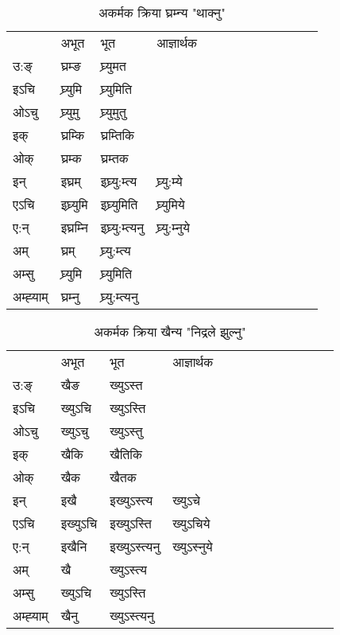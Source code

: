 \begin{table}[H]
\label{um.vi} \centering
\caption{अकर्मक क्रिया  घ्रम्‍न्य  "थाक्नु"  }
\begin{tabular}{l|l|l|l|l|l|l|l|l|l|l|l|l}  \toprule
&अभूत & भूत & आज्ञार्थक \\ 
उ:ङ्‌ &घ्रम्ङ &घ्र्युमत \\ 
इऽचि &घ्र्युमि &घ्र्युमिति   \\ 
ओऽचु &घ्र्युमु &घ्र्युमुतु   \\ 
इक् &घ्रम्कि &घ्रम्तिकि   \\ 
ओक् &घ्रम्क &घ्रम्तक   \\ 
इन् & इघ्रम् & इघ्र्यु:म्त्य &घ्र्यु:म्ये  \\ 
एऽचि & इघ्र्युमि & इघ्र्युमिति &घ्र्युमिये    \\ 
ए:न् & इघ्रम्‍नि  & इघ्र्यु:म्त्यनु &घ्र्यु:म्‍नुये  \\ 
अम् & घ्रम् & घ्र्यु:म्त्य   \\ 
अम्सु & घ्र्युमि & घ्र्युमिति   \\ 
अम्ह्‍याम् & घ्रम्‍नु  & घ्र्यु:म्त्यनु \\ 
\bottomrule
\end{tabular}
\end{table}


\begin{table}[H]
\label{un.vi} \centering
\caption{अकर्मक क्रिया  खैन्य  "निद्रले झुल्नु"  }
\begin{tabular}{l|l|l|l|l|l|l|l|l|l|l|l|l}  \toprule
&अभूत & भूत & आज्ञार्थक \\ 
उ:ङ्‌ &खैङ &ख्युऽस्त \\ 
इऽचि &ख्युऽचि &ख्युऽस्ति   \\ 
ओऽचु &ख्युऽचु &ख्युऽस्तु   \\ 
इक् &खैकि &खैतिकि   \\ 
ओक् &खैक &खैतक   \\ 
इन् & इखै & इख्युऽस्त्य &ख्युऽचे  \\ 
एऽचि & इख्युऽचि & इख्युऽस्ति &ख्युऽचिये    \\ 
ए:न् & इखैनि  & इख्युऽस्त्यनु &ख्युऽस्‍नुये  \\ 
अम् & खै & ख्युऽस्त्य   \\ 
अम्सु & ख्युऽचि & ख्युऽस्ति   \\ 
अम्ह्‍याम् & खैनु  & ख्युऽस्त्यनु \\ 
\bottomrule
\end{tabular}
\end{table}


